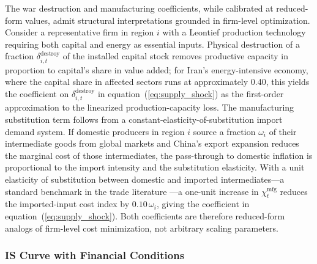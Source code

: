 \documentclass[12pt]{article}
\begin{document}
The war destruction and manufacturing coefficients, while calibrated at reduced-form values, admit structural interpretations grounded in firm-level optimization. Consider a representative firm in region $i$ with a Leontief production technology requiring both capital and energy as essential inputs. Physical destruction of a fraction $\delta^{\text{destroy}}_{i,t}$ of the installed capital stock removes productive capacity in proportion to capital's share in value added; for Iran's energy-intensive economy, where the capital share in affected sectors runs at approximately 0.40, this yields the coefficient on $\delta^{\text{destroy}}_{i,t}$ in equation~(\ref{eq:supply_shock}) as the first-order approximation to the linearized production-capacity loss. The manufacturing substitution term follows from a constant-elasticity-of-substitution import demand system. If domestic producers in region $i$ source a fraction $\omega_i$ of their intermediate goods from global markets and China's export expansion reduces the marginal cost of those intermediates, the pass-through to domestic inflation is proportional to the import intensity and the substitution elasticity. With a unit elasticity of substitution between domestic and imported intermediates---a standard benchmark in the trade literature \citep{bodenstein2011oil}---a one-unit increase in $\chi^{\text{mfg}}_t$ reduces the imported-input cost index by $0.10\,\omega_i$, giving the coefficient in equation~(\ref{eq:supply_shock}). Both coefficients are therefore reduced-form analogs of firm-level cost minimization, not arbitrary scaling parameters.

\subsubsection{IS Curve with Financial Conditions}
\end{document}
